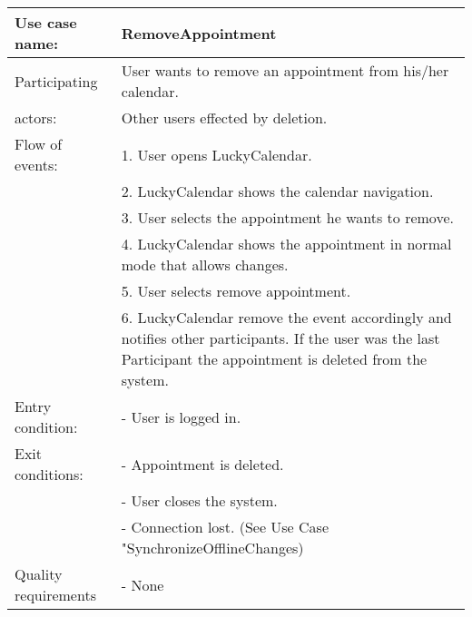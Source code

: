{\tabulinesep=1.2mm
\begin{tabu}{ | p{3cm} | p{13cm} |}
    \hline
    Use case name: 			& 		RemoveAppointment\\ \hline
    Participating  			& 		User wants to remove an appointment from his/her calendar. \\
    actors:					&		Other users effected by deletion.\\ \hline
    Flow of events: 		& 		1. User opens LuckyCalendar. \\
							&		2. LuckyCalendar shows the calendar navigation.\\
							&		3. User selects the appointment he wants to remove.\\
							&		4. LuckyCalendar shows the appointment in normal mode that allows changes.\\
							&		5. User selects remove appointment.\\
							&		6. LuckyCalendar remove the event accordingly and notifies other participants. If the user was the last Participant the appointment is deleted from the system.\\\hline
    Entry condition: 		& 		- User is logged in.  \\\hline
	Exit conditions: 		&		- Appointment is deleted.\\
							&		- User closes the system.\\
							&		- Connection lost. (See Use Case "SynchronizeOfflineChanges)\\\hline
	Quality requirements	&	 	- None \\\hline
\end{tabu}
}